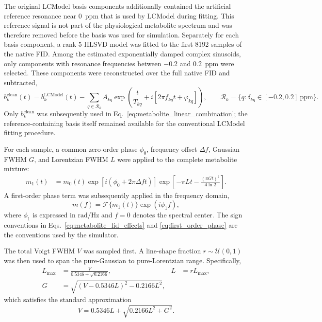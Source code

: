 The original LCModel basis components additionally contained the artificial
reference resonance near $0$~ppm that is used by LCModel during fitting.  This
reference signal is not part of the physiological metabolite spectrum and was
therefore removed before the basis was used for simulation.  Separately for
each basis component, a rank-5 HLSVD model was fitted to the first 8192 samples
of the native FID.  Among the estimated exponentially damped complex
sinusoids, only components with resonance frequencies between $-0.2$ and
$0.2$~ppm were selected.  These components were reconstructed over the full
native FID and subtracted,
\begin{equation}
    b_k^{\mathrm{clean}}(t)
    = b_k^{\mathrm{LCModel}}(t)
    - \sum_{q\in\mathcal{R}_k}
      A_{kq}\exp\!\left(
        \frac{t}{T_{kq}}
        + i\left[2\pi f_{kq}t+\varphi_{kq}\right]
      \right),
    \qquad
    \mathcal{R}_k=\{q:\delta_{kq}\in[-0.2,0.2]\ \mathrm{ppm}\}.
    \label{eq:basis_reference_removal}
\end{equation}
Only $b_k^{\mathrm{clean}}$ was subsequently used in
Eq.~\eqref{eq:metabolite_linear_combination}; the reference-containing basis
itself remained available for the conventional LCModel fitting procedure.

For each sample, a common zero-order phase $\phi_0$, frequency offset
$\Delta f$, Gaussian FWHM $G$, and Lorentzian FWHM $L$ were applied to the
complete metabolite mixture:
\begin{align}
    m_1(t)
    &= m_0(t)
       \exp\!\left[i\left(\phi_0+2\pi\Delta f t\right)\right]
       \exp\!\left[-\pi L t
       -\frac{(\pi Gt)^2}{4\ln 2}\right].
    \label{eq:metabolite_fid_effects}
\end{align}
A first-order phase term was subsequently applied in the frequency domain,
\begin{equation}
    m(f)=\mathcal{F}\{m_1(t)\}\exp(i\phi_1 f),
    \label{eq:first_order_phase}
\end{equation}
where $\phi_1$ is expressed in $\mathrm{rad/Hz}$ and $f=0$ denotes the
spectral center.  The sign conventions in Eqs.~\eqref{eq:metabolite_fid_effects}
and \eqref{eq:first_order_phase} are the conventions used by the simulator.

The total Voigt FWHM $V$ was sampled first.  A line-shape fraction
$r\sim\mathcal{U}(0,1)$ was then used to span the pure-Gaussian to
pure-Lorentzian range.  Specifically,
\begin{align}
    L_{\max} &= \frac{V}{0.5346+\sqrt{0.2166}}, &
    L &= rL_{\max},\\
    G &= \sqrt{(V-0.5346L)^2-0.2166L^2},
    \label{eq:voigt_split}
\end{align}
which satisfies the standard approximation
\begin{equation}
    V = 0.5346L + \sqrt{0.2166L^2+G^2}.
\end{equation}

